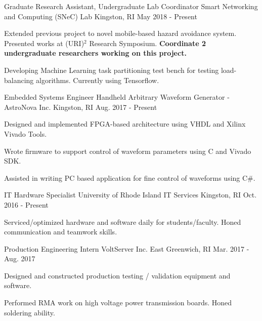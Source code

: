 \begin{cventries}
  \cventry
    {Graduate Research Assistant, Undergraduate Lab Coordinator}
    {Smart Networking and Computing (SNeC) Lab}
    {Kingston, RI}
    {May 2018 - Present}
    {
      \begin{cvitems}
        \item {Extended previous project to novel mobile-based hazard avoidance system. Presented works at (URI)$^2$ Research Symposium. \newline\textbf{Coordinate 2 undergraduate researchers working on this project.}}
        \item{Developing Machine Learning task partitioning test bench for testing load-balancing algorithms. Currently using Tensorflow.}
      \end{cvitems}
    }
    
  \cventry
    {Embedded Systems Engineer}
    {Handheld Arbitrary Waveform Generator - AstroNova Inc.}
    {Kingston, RI}
    {Aug. 2017 - Present}
    {
      \begin{cvitems}
        \item {Designed and implemented FPGA-based architecture using VHDL and Xilinx Vivado Tools.}
        \item {Wrote firmware to support control of waveform parameters using C and Vivado SDK.}
        \item {Assisted in writing PC based application for fine control of waveforms using C\#.}
      \end{cvitems}
    }
\cventry
    {IT Hardware Specialist}
    {University of Rhode Island IT Services}
    {Kingston, RI}
    {Oct. 2016 - Present}
    {
      \begin{cvitems}
        \item {Serviced/optimized hardware and software daily for students/faculty. Honed communication and teamwork skills.}
      \end{cvitems}
    }
  \cventry
    {Production Engineering Intern}
    {VoltServer Inc.}
    {East Greenwich, RI}
    {Mar. 2017 - Aug. 2017}
    {
      \begin{cvitems}
        \item {Designed and constructed production testing / validation equipment and software.}
        \item {Performed RMA work on high voltage power transmission boards. Honed soldering ability.}
      \end{cvitems}
    }
 \end{cventries}